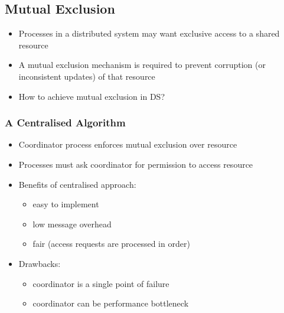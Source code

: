 \subsection{Mutual Exclusion}
\begin{itemize}
	\item Processes in a distributed system may want exclusive access to a shared resource
	\item A mutual exclusion mechanism is required to prevent corruption (or inconsistent updates) of that resource
	\item How to achieve mutual exclusion in DS?	
\end{itemize}

\subsubsection{A Centralised Algorithm}
\begin{itemize}
	\item Coordinator process enforces mutual exclusion over resource
	\item Processes must ask coordinator for permission to access resource
	\item Benefits of centralised approach:
	\begin{itemize}
		\item easy to implement
		\item low message overhead
		\item fair (access requests are processed in order)
	\end{itemize}
	\item Drawbacks:
	\begin{itemize}
		\item coordinator is a single point of failure
		\item coordinator can be performance bottleneck
	\end{itemize}
\end{itemize}

